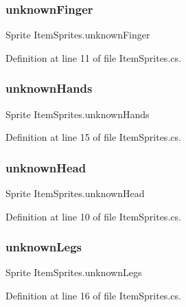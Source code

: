 \subsubsection{\texorpdfstring{unknownFinger}{unknownFinger}}
{\footnotesize\ttfamily Sprite Item\+Sprites.\+unknown\+Finger}



Definition at line 11 of file Item\+Sprites.\+cs.

\mbox{\label{class_item_sprites_a486a4bd48f884fda6e69bf2cbf7f7f28}} 
\subsubsection{\texorpdfstring{unknownHands}{unknownHands}}
{\footnotesize\ttfamily Sprite Item\+Sprites.\+unknown\+Hands}



Definition at line 15 of file Item\+Sprites.\+cs.

\mbox{\label{class_item_sprites_a69f91667aebb0441952acc7b22e2680b}} 
\subsubsection{\texorpdfstring{unknownHead}{unknownHead}}
{\footnotesize\ttfamily Sprite Item\+Sprites.\+unknown\+Head}



Definition at line 10 of file Item\+Sprites.\+cs.

\mbox{\label{class_item_sprites_a67fccfa226dd5c1e6295ec6783be0688}} 
\subsubsection{\texorpdfstring{unknownLegs}{unknownLegs}}
{\footnotesize\ttfamily Sprite Item\+Sprites.\+unknown\+Legs}



Definition at line 16 of file Item\+Sprites.\+cs.

\mbox{\label{class_item_sprites_ae998a241707a0954c0897fb15064bf7a}} 
